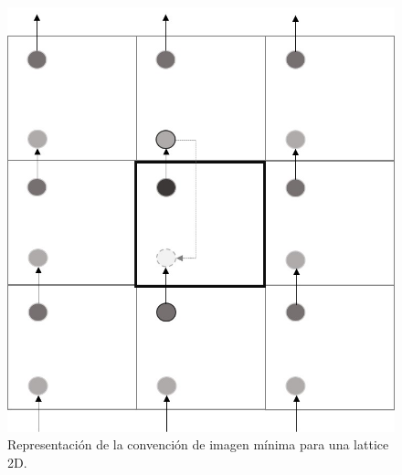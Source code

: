 \documentclass[onecolumn]{article}
\begin{document}
 \begin{figure}[h!]
	\includegraphics[scale=0.29]{imagen_min.jpg}
	\caption{Representación de la convención de imagen mínima para una lattice 2D.}
	\label{fig:min2d}
\end{figure}
\end{document}
